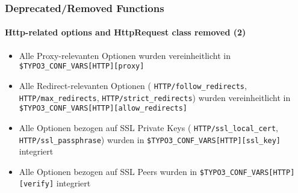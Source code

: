 \begin{frame}[fragile]
	\frametitle{Deprecated/Removed Functions}
	\framesubtitle{Http-related options and HttpRequest class removed (2)}

	\begin{itemize}

		\item Alle Proxy-relevanten Optionen wurden vereinheitlicht in\newline
			\small\texttt{\$TYPO3\_CONF\_VARS[HTTP][proxy]}\normalsize

		\item Alle Redirect-relevanten Optionen
			(\small
				\texttt{HTTP/follow\_redirects},
				\texttt{HTTP/max\_redirects},
				\texttt{HTTP/strict\_redirects}\normalsize)
			wurden vereinheitlicht in
			\small
				\texttt{\$TYPO3\_CONF\_VARS[HTTP][allow\_redirects]}
			\normalsize

		\item Alle Optionen bezogen auf SSL Private Keys
			(\small
				\texttt{HTTP/ssl\_local\_cert},
				\texttt{HTTP/ssl\_passphrase}\normalsize)
			wurden in
			\small
				\texttt{\$TYPO3\_CONF\_VARS[HTTP][ssl\_key]}
			\normalsize
			integriert

		\item Alle Optionen bezogen auf SSL Peers wurden in
			\small
				\texttt{\$TYPO3\_CONF\_VARS[HTTP][verify]}
			\normalsize
			integriert

	\end{itemize}

\end{frame}


